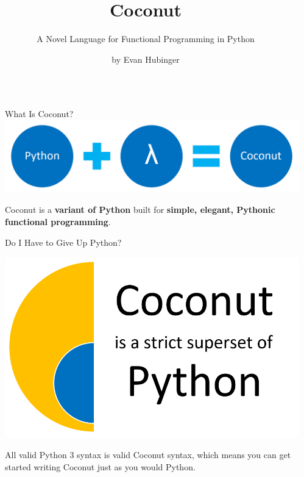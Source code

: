 \documentclass[final,hyperref={pdfpagelabels=false}]{beamer}
\title{Coconut}
\subtitle{A Novel Language for Functional Programming in Python}
\author{by Evan Hubinger}
\begin{document}
\begin{frame}[containsverbatim,t] %
\begin{columns}[t] %

\begin{column}{.011\textwidth}\end{column} %
\begin{column}{.32\textwidth} %


\begin{block}{What Is Coconut?}
\includegraphics[scale=1.95]{coconut_fp.png}

\large Coconut is a \textbf{variant of Python} built for \textbf{simple, elegant, Pythonic functional programming}.
\end{block}

\begin{block}{Do I Have to Give Up Python?}
\begin{minipage}{0\textwidth}
\includegraphics[scale=1.5]{coconut_syntax.png}
\end{minipage} \hfill \begin{minipage}{0.45\textwidth}
\large All valid Python 3 syntax is valid Coconut syntax, which means you can get started writing Coconut just as you would Python.
\end{minipage}
\end{block}


\end{column}
\end{columns}
\end{frame}
\end{document}
